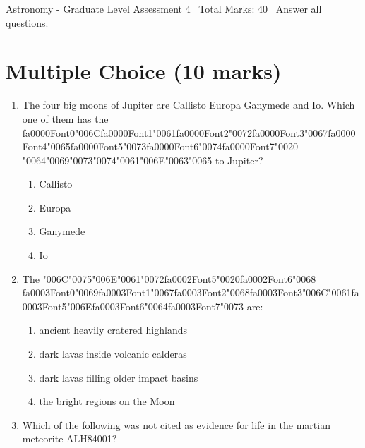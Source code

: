 \documentclass[12pt]{article}
\begin{document}
\begin{center}
Astronomy - Graduate Level Assessment 4 \
Total Marks: 40 \
Answer all questions.
\end{center}

\section*{Multiple Choice (10 marks)}
\begin{enumerate}[label=\arabic*.]
\item The four big moons of Jupiter are Callisto Europa Ganymede and Io. Which one of them has
the {\csname fa0000Font0\endcsname\char"006C}{\csname fa0000Font1\endcsname\char"0061}{\csname fa0000Font2\endcsname\char"0072}{\csname fa0000Font3\endcsname\char"0067}{\csname fa0000Font4\endcsname\char"0065}{\csname fa0000Font5\endcsname\char"0073}{\csname fa0000Font6\endcsname\char"0074}{\csname fa0000Font7\endcsname\char"0020} {\char"0064}{\char"0069}{\char"0073}{\char"0074}{\char"0061}{\char"006E}{\char"0063}{\char"0065} to Jupiter?
\begin{enumerate}[label=(\alph*)]
    \item Callisto
    \item Europa
    \item Ganymede
    \item Io
\end{enumerate}
\item The {\char"006C}{\char"0075}{\char"006E}{\char"0061}{\char"0072}{\csname fa0002Font5\endcsname\char"0020}{\csname fa0002Font6\endcsname\char"0068} {\csname fa0003Font0\endcsname\char"0069}{\csname fa0003Font1\endcsname\char"0067}{\csname fa0003Font2\endcsname\char"0068}{\csname fa0003Font3\endcsname\char"006C}{\char"0061}{\csname fa0003Font5\endcsname\char"006E}{\csname fa0003Font6\endcsname\char"0064}{\csname fa0003Font7\endcsname\char"0073} are:
\begin{enumerate}[label=(\alph*)]
    \item ancient heavily cratered highlands
    \item dark lavas inside volcanic calderas
    \item dark lavas filling older impact basins
    \item the bright regions on the Moon
\end{enumerate}
\item Which of the following was not cited as evidence for life in the martian meteorite
ALH84001?
\begin{enumerate}[label=(\alph*)]

\end{enumerate}
\end{enumerate}
\end{document}
